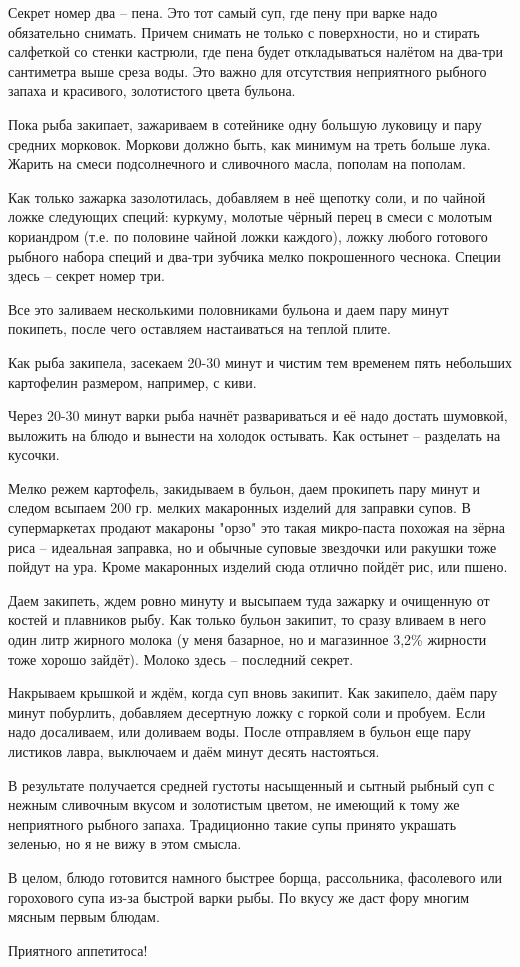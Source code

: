 Секрет номер два – пена. Это тот самый суп, где пену при варке надо обязательно
снимать. Причем снимать не только с поверхности, но и стирать салфеткой со
стенки кастрюли, где пена будет откладываться налётом на два-три сантиметра
выше среза воды. Это важно для отсутствия неприятного рыбного запаха и
красивого, золотистого цвета бульона.

Пока рыба закипает, зажариваем в сотейнике одну большую луковицу и пару средних
морковок. Моркови должно быть, как минимум на треть больше лука. Жарить на
смеси подсолнечного и сливочного масла, пополам на пополам. 

Как только зажарка зазолотилась, добавляем в неё щепотку соли, и по чайной
ложке следующих специй: куркуму, молотые чёрный перец в смеси с молотым
кориандром (т.е. по половине чайной ложки каждого), ложку любого готового
рыбного набора специй и два-три зубчика мелко покрошенного чеснока. Специи
здесь – секрет номер три. 

Все это заливаем несколькими половниками бульона и даем пару минут покипеть,
после чего оставляем настаиваться на теплой плите.  

Как рыба закипела, засекаем 20-30 минут и чистим тем временем пять небольших
картофелин размером, например, с киви.

Через 20-30 минут варки рыба начнёт развариваться и её надо достать шумовкой,
выложить на блюдо и вынести на холодок остывать. Как остынет – разделать на
кусочки.

Мелко режем картофель, закидываем в бульон, даем прокипеть пару минут и следом
всыпаем 200 гр. мелких макаронных изделий для заправки супов. В супермаркетах
продают макароны "орзо" это такая микро-паста похожая на зёрна риса – идеальная
заправка, но и обычные суповые звездочки или ракушки тоже пойдут на ура. Кроме
макаронных изделий сюда отлично пойдёт рис, или пшено.

Даем закипеть, ждем ровно минуту и высыпаем туда зажарку и очищенную от костей
и плавников рыбу. Как только бульон закипит, то сразу вливаем в него один литр
жирного молока (у меня базарное, но и магазинное 3,2\% жирности тоже хорошо
зайдёт). Молоко здесь – последний секрет. 

Накрываем крышкой и ждём, когда суп вновь закипит. Как закипело, даём пару
минут побурлить, добавляем десертную ложку с горкой соли и пробуем. Если надо
досаливаем, или доливаем воды. После отправляем в бульон еще пару листиков
лавра, выключаем и даём минут десять настояться.

В результате получается средней густоты насыщенный и сытный рыбный суп с нежным
сливочным вкусом и золотистым цветом, не имеющий к тому же неприятного рыбного
запаха. Традиционно такие супы принято украшать зеленью, но я не вижу в этом
смысла.

В целом, блюдо готовится намного быстрее борща, рассольника, фасолевого или
горохового супа из-за быстрой варки рыбы. По вкусу же даст фору многим мясным
первым блюдам. 

Приятного аппетитоса!


